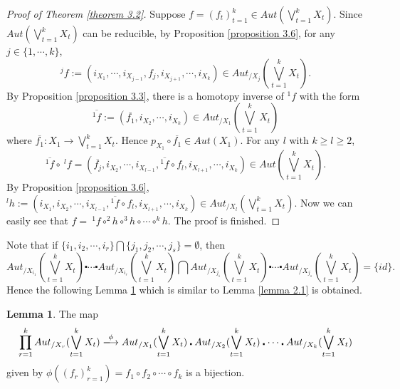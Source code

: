 \documentclass[12pt]{article}
\theoremstyle{theorem}
\theoremstyle{definition}
\theoremstyle{proposition}
\theoremstyle{corollary}
\theoremstyle{lemma}
\newtheorem{lemma}[theorem]{Lemma}
\theoremstyle{remark}
\theoremstyle{example}
\begin{document}
{\begin{proof}[Proof of Theorem \ref{theorem 3.2}]
Suppose $f=(f_{t})_{t=1}^{k}\in Aut(\bigvee\limits_{t=1}^{k}X_{t})$. Since $Aut(\bigvee\limits_{t=1}^{k}X_{t})$ can be reducible, by Proposition \ref{proposition 3.6}, for any $j\in\{1,\cdots,k\}$, $$^{j}f:=(i_{X_1},\cdots,i_{X_{j-1}},f_{j},i_{X_{j+1}},\cdots,i_{X_{k}})\in {\ensuremath{Aut_{/X_{{j}}}(\bigvee\limits_{t=1}^{k}X_{t})}}.$$
By Proposition \ref{proposition 3.3}, there is a homotopy inverse of $^{1}f$ with the form
$$\overline{^{1}f}:=(\overline{f_{1}},i_{X_{2}},\cdots,i_{X_{k}})\in {\ensuremath{Aut_{/X_{{1}}}(\bigvee\limits_{t=1}^{k}X_{t})}}$$
where $\overline{f_{1}}: X_{1}\rightarrow \bigvee\limits_{t=1}^{k}X_{t}$. Hence $p_{X_{1}}{\ensuremath{{\scriptstyle\circ}}}\overline{f_{1}}\in Aut(X_{1})$.
For any $l$ with $k\geq l\geq 2$,
$$\overline{^{1}f}{\ensuremath{{\scriptstyle\circ}}}~ ^{l}f=(\overline{f_{j}},i_{X_2},\cdots,i_{X_{l-1}},\overline{^{1}f}{\ensuremath{{\scriptstyle\circ}}} f_{l},i_{X_{l+1}},\cdots,i_{X_{k}})\in Aut(\bigvee\limits_{t=1}^{k}X_{t}).$$
By Proposition \ref{proposition 3.6}, $^{l}h:=(i_{X_1},i_{X_2},\cdots,i_{X_{l-1}},\overline{^{1}f}{\ensuremath{{\scriptstyle\circ}}} f_{l},i_{X_{l+1}},\cdots,i_{X_{k}})\in {\ensuremath{Aut_{/X_{{l}}}(\bigvee\limits_{t=1}^{k}X_{t})}}.$
Now we can easily see that $f= ~^{1}f{\ensuremath{{\scriptstyle\circ}}} ^{2}h{\ensuremath{{\scriptstyle\circ}}} ^{3}h{\ensuremath{{\scriptstyle\circ}}} \cdots{\ensuremath{{\scriptstyle\circ}}} ^{k}h$. The proof is finished.
\end{proof}

Note that if  $\{i_1,i_2,\cdots,i_r\}\bigcap\{j_1,j_2,\cdots,j_s\}=\emptyset$, then
$${\ensuremath{Aut_{/X_{{i_1}}}(\bigvee\limits_{t=1}^{k}X_{t})}}\centerdot\cdots\centerdot{\ensuremath{Aut_{/X_{{i_r}}}(\bigvee\limits_{t=1}^{k}X_{t})}}\bigcap {\ensuremath{Aut_{/X_{{j_1}}}(\bigvee\limits_{t=1}^{k}X_{t})}}\centerdot\cdots\centerdot{\ensuremath{Aut_{/X_{{j_s}}}(\bigvee\limits_{t=1}^{k}X_{t})}}=\{ id\}.$$
Hence  the following Lemma \ref{lemma3.7} which is similar to Lemma \ref{lemma 2.1} is obtained.

\begin{lemma}\label{lemma3.7}
 The map
  $$\prod\limits_{r=1}^{k}{\ensuremath{Aut_{/X_{{r}}}(\bigvee\limits_{t=1}^{k}X_{t})}} \xlongrightarrow{\phi}{\ensuremath{Aut_{/X_{{1}}}(\bigvee\limits_{t=1}^{k}X_{t})}}\centerdot{\ensuremath{Aut_{/X_{{2}}}(\bigvee\limits_{t=1}^{k}X_{t})}}\centerdot \cdots\centerdot{\ensuremath{Aut_{/X_{{k}}}(\bigvee\limits_{t=1}^{k}X_{t})}} $$
given by $\phi((f_{r})_{r=1}^{k})=f_{1}{\ensuremath{{\scriptstyle\circ}}} f_{2}{\ensuremath{{\scriptstyle\circ}}}\cdots{\ensuremath{{\scriptstyle\circ}}} f_{k}$ is a bijection.
 \end{lemma}

}
\end{document}
